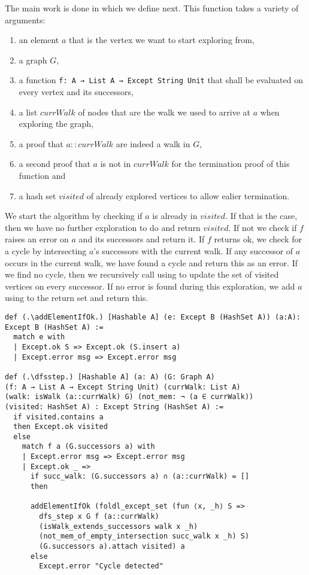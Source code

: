 The main work is done in \dfsstep which we define next. This function takes a variety of arguments:
\begin{enumerate}
    \item an element $a$ that is the vertex we want to start exploring from,
    \item a graph $G$,
    \item a function \lstinline|f: A → List A → Except String Unit| that shall be evaluated on every vertex and its successors,
    \item a list $currWalk$ of nodes that are the walk we used to arrive at $a$ when exploring the graph,
    \item a proof that $a::currWalk$ are indeed a walk in $G$,
    \item a second proof that $a$ is not in $currWalk$ for the termination proof of this function and
    \item a hash set $visited$ of already explored vertices to allow ealier termination.
\end{enumerate}

We start the algorithm by checking if $a$ is already in $visited$. If that is the case, then we have no further exploration to do and return $visited$. If not we check if $f$ raises an error on $a$ and its successors and return it. If $f$ returns ok, we check for a cycle by intersecting $a$'s successors with the current walk. If any successor of $a$ occurs in the current walk, we have found a cycle and return this as an error. If we find no cycle, then we recursively call \dfsstep using \foldlexceptset to update the set of visited vertices on every successor. If no error is found during this exploration, we add $a$ using \addElementIfOk to the return set and return this.

\begin{lstlisting}
def (.\addElementIfOk.) [Hashable A] (e: Except B (HashSet A)) (a:A): Except B (HashSet A) :=
  match e with
  | Except.ok S => Except.ok (S.insert a)
  | Except.error msg => Except.error msg

def (.\dfsstep.) [Hashable A] (a: A) (G: Graph A) 
(f: A → List A → Except String Unit) (currWalk: List A) 
(walk: isWalk (a::currWalk) G) (not_mem: ¬ (a ∈ currWalk)) 
(visited: HashSet A) : Except String (HashSet A) :=
  if visited.contains a
  then Except.ok visited
  else
    match f a (G.successors a) with
    | Except.error msg => Except.error msg
    | Except.ok _ =>
      if succ_walk: (G.successors a) ∩ (a::currWalk) = []
      then

      addElementIfOk (foldl_except_set (fun ⟨x, _h⟩ S =>
        dfs_step x G f (a::currWalk) 
        (isWalk_extends_successors walk x _h) 
        (not_mem_of_empty_intersection succ_walk x _h) S) 
        (G.successors a).attach visited) a
      else
        Except.error "Cycle detected"
\end{lstlisting}

